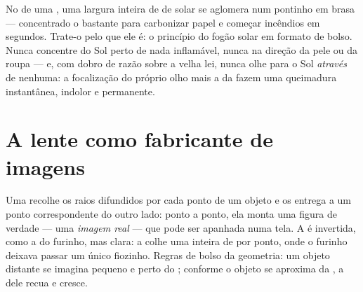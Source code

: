 \begin{remark}\label{rem:g8:lenses-images:burning}
No  de uma , uma largura inteira de  de 
solar se aglomera num pontinho em brasa --- concentrado o bastante
para carbonizar papel e começar incêndios em segundos. Trate-o pelo
que ele é: o princípio do fogão solar em formato de bolso. Nunca
concentre  do Sol perto de nada inflamável, nunca na direção da
pele ou da roupa --- e, com dobro de razão sobre a velha lei, nunca
olhe para o Sol \emph{através} de  nenhuma: a focalização do
próprio olho mais a da  fazem uma queimadura instantânea,
indolor e permanente.
\end{remark}

\section{A lente como fabricante de imagens}

\begin{proposition}\label{prop:g8:lenses-images:realimage}
Uma  recolhe os raios difundidos por cada ponto de
um objeto e os entrega a um ponto correspondente do outro lado: ponto
a ponto, ela monta uma figura de verdade --- uma \emph{imagem
real} --- que pode ser apanhada numa tela. A
 é invertida, como a do furinho, mas clara: a  colhe uma
 inteira de  por ponto, onde o furinho deixava passar um
único fiozinho. Regras de bolso da geometria: um objeto distante se
imagina pequeno e perto do ; conforme o objeto se aproxima da
, a  dele recua e cresce.
\end{proposition}

